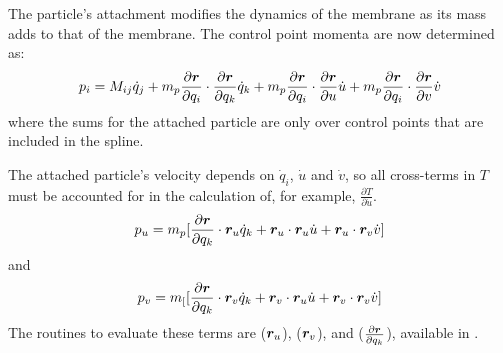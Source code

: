 The particle's attachment modifies the dynamics of the membrane as its mass adds to that of the membrane.
The control point momenta are now determined as:
\begin{equation}
p_i = M_{ij} \dot{q}_j + m_p \frac{\partial \boldsymbol{r}}{\partial q_i} \cdot \frac{\partial \boldsymbol{r}}{\partial q_k} \dot{q}_k 
  + m_p \frac{\partial \boldsymbol{r}}{\partial q_i} \cdot \frac{\partial \boldsymbol{r}}{\partial u} \dot{u} 
  + m_p \frac{\partial \boldsymbol{r}}{\partial q_i} \cdot \frac{\partial \boldsymbol{r}}{\partial v} \dot{v} 
\label{eq:pmesh}
\end{equation}
where the sums for the attached particle are only over control points that are included in the spline.

The attached particle's velocity depends on $\dot{q}_i$, $\dot{u}$ and $\dot{v}$, so all cross-terms in $T$ must be accounted for in the calculation of, for example, $\frac{\partial T}{\partial \dot{u}}$.
\begin{equation}
p_{u} = m_p [\frac{\partial \boldsymbol{r}}{\partial q_k} \cdot \boldsymbol{r}_u \dot{q}_k +  \boldsymbol{r}_u \cdot \boldsymbol{r}_u \dot{u}  +  \boldsymbol{r}_u \cdot \boldsymbol{r}_v \dot{v} ] 
\label{eq:pu}
\end{equation}
and
\begin{equation}
p_{v} = m_[ [\frac{\partial \boldsymbol{r}}{\partial q_k} \cdot \boldsymbol{r}_v \dot{q}_k +  \boldsymbol{r}_v \cdot \boldsymbol{r}_u \dot{u}  +  \boldsymbol{r}_v \cdot \boldsymbol{r}_v \dot{v} ] 
\label{eq:pv}
\end{equation}
The routines to evaluate these terms are  ($\boldsymbol{r}_u$),  ($\boldsymbol{r}_v$), and  ($\frac{\partial \boldsymbol{r}}{\partial q_k}$), available in .


